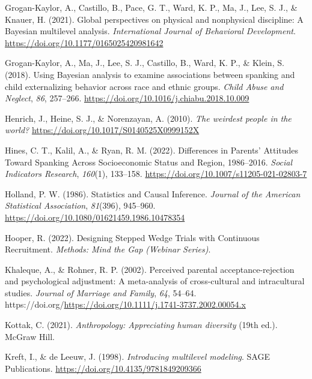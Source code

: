 \documentclass[
  letterpaper,
  DIV=11,
  numbers=noendperiod]{scrreprt}
\newlength{\cslhangindent}
\newlength{\cslentryspacingunit} %
\newenvironment{CSLReferences}[2] %
 {%
  \setlength{\parindent}{0pt}
  \ifodd #1
  \let\oldpar\par
  \def\par{\hangindent=\cslhangindent\oldpar}
  \fi
  \setlength{\parskip}{#2\cslentryspacingunit}
 }%
 {}
\begin{document}
\begin{CSLReferences}{1}{0}
\leavevmode{}%
Grogan-Kaylor, A., Castillo, B., Pace, G. T., Ward, K. P., Ma, J., Lee,
S. J., \& Knauer, H. (2021). {Global perspectives on physical and
nonphysical discipline: A {B}ayesian multilevel analysis}.
\emph{International Journal of Behavioral Development}.
\url{https://doi.org/10.1177/0165025420981642}

\leavevmode{}%
Grogan-Kaylor, A., Ma, J., Lee, S. J., Castillo, B., Ward, K. P., \&
Klein, S. (2018). Using {B}ayesian analysis to examine associations
between spanking and child externalizing behavior across race and ethnic
groups. \emph{Child Abuse and Neglect}, \emph{86}, 257--266.
\url{https://doi.org/10.1016/j.chiabu.2018.10.009}

\leavevmode{}%
Henrich, J., Heine, S. J., \& Norenzayan, A. (2010). \emph{{The weirdest
people in the world?}} \url{https://doi.org/10.1017/S0140525X0999152X}

\leavevmode{}%
Hines, C. T., Kalil, A., \& Ryan, R. M. (2022). {Differences in Parents'
Attitudes Toward Spanking Across Socioeconomic Status and Region,
1986--2016}. \emph{Social Indicators Research}, \emph{160}(1), 133--158.
\url{https://doi.org/10.1007/s11205-021-02803-7}

\leavevmode{}%
Holland, P. W. (1986). {Statistics and Causal Inference}. \emph{Journal
of the American Statistical Association}, \emph{81}(396), 945--960.
\url{https://doi.org/10.1080/01621459.1986.10478354}

\leavevmode{}%
Hooper, R. (2022). {Designing Stepped Wedge Trials with Continuous
Recruitment}. \emph{Methods: Mind the Gap (Webinar Series)}.

\leavevmode{}%
Khaleque, A., \& Rohner, R. P. (2002). Perceived parental
acceptance-rejection and psychological adjustment: A meta-analysis of
cross-cultural and intracultural studies. \emph{Journal of Marriage and
Family}, \emph{64}, 54--64.
https://doi.org/\url{https://doi.org/10.1111/j.1741-3737.2002.00054.x}

\leavevmode{}%
Kottak, C. (2021). \emph{Anthropology: Appreciating human diversity}
(19th ed.). McGraw Hill.

\leavevmode{}%
Kreft, I., \& de Leeuw, J. (1998). \emph{Introducing multilevel
modeling}. SAGE Publications.
\url{https://doi.org/10.4135/9781849209366}


\end{CSLReferences}
\end{document}
